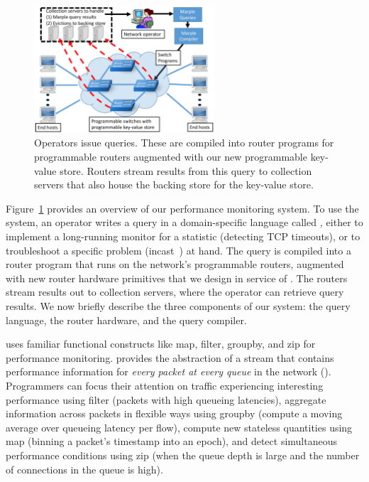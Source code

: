 \begin{figure}[!t]
\centering
\includegraphics[width=0.6\textwidth]{pq_overview.pdf}
\caption{Operators issue \TheSystem queries. These are compiled into router
programs for programmable routers augmented with our new programmable key-value
store. Routers stream results from this query to collection servers that also
house the backing store for the key-value store.}
\label{fig:overview}
\end{figure}

Figure~\ref{fig:overview} provides an overview of our performance monitoring
system. To use the system, an operator writes a query in a domain-specific
language called {\em \TheSystem,} either to implement a long-running monitor
for a statistic (\eg detecting TCP timeouts), or to troubleshoot a specific
problem (\eg incast~\cite{tcpincast}) at hand. The query is compiled into a
router program that runs on the network's programmable routers, augmented with
new router hardware primitives that we design in service of \TheSystem.  The
routers stream results out to collection servers, where the operator can
retrieve query results. We now briefly describe the three components of our
system: the query language, the router hardware, and the query compiler.

 \TheSystem uses familiar functional
constructs like {\ct map}, {\ct filter}, {\ct groupby}, and {\ct zip} for
performance monitoring.  \TheSystem provides the abstraction of a stream that
contains performance information for {\em every packet at every queue} in the
network ().  Programmers can focus their attention on traffic
experiencing interesting performance using {\ct filter} (\eg packets with high
queueing latencies), aggregate information across packets in flexible ways
using {\ct groupby} (\eg compute a moving average over queueing latency per
flow), compute new stateless quantities using {\ct map} (\eg binning a packet's
timestamp into an epoch), and detect simultaneous performance conditions using
{\ct zip} (\eg when the queue depth is large and the number of connections in
the queue is high).

